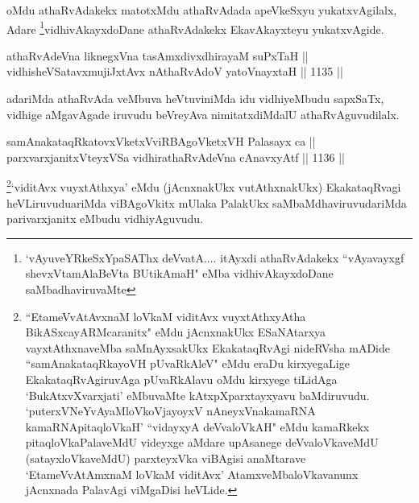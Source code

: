 \begin{artha}
oMdu athaRvAdakekx matotxMdu athaRvAdada apeVkeSxyu yukatxvAgilalx, Adare \footnote{`vAyuveYRkeSxYpaSAThx deVvatA.... itAyxdi athaRvAdakekx ``vAyavayxgf shevxVtamAlaBeVta BUtikAmaH" eMba vidhivAkayxdoDane saMbadhaviruvaMte}vidhivAkayxdoDane athaRvAdakekx EkavAkayxteyu yukatxvAgide.
\end{artha}

\begin{shl}
athaRvAdeVna liknegxVna tasAmxdivxdhirayaM suPxTaH || \\
vidhisheVSatavxmujiJxtAvx nAthaRvAdoV yatoV\s nayxtaH \hfill || 1135 ||  
\end{shl}

\begin{artha}
adariMda athaRvAda veMbuva heVtuviniMda idu vidhiyeMbudu sapxSaTx, vidhige aMgavAgade iruvudu beVreyAva nimitatxdiMdalU athaRvAguvudilalx.
\end{artha}


\begin{shl}
samAnakataqRkatovxVketxVviRBAgoVketxVH Palasayx ca || \\
parxvarxjanitxVteyxVSa vidhirathaRvAdeVna cAnavxyAtf \hfill || 1136 ||  
\end{shl}

\begin{artha}
\footnote{``EtameVvA\s \s tAvxnaM loVkaM viditAvx vuyxtAthxyAtha BikASxcayARMcaranitx" eMdu jAcnxnakUkx ESaNAtarxya vayxtAthxnaveMba saMnAyxsakUkx EkakataqRvAgi nideRVsha mADide ``samAnakataqRkayoVH pUvaRkAleV" eMdu eraDu kirxyegaLige EkakataqRvAgiruvAga pUvaRkAlavu oMdu kirxyege tiLidAga `BukAtxvXvarxjati' eMbuvaMte kAtxpXparxtayxyavu baMdiruvudu. `puterxVNeYvAyaMloVkoVjayoyxV nAneyxVnakamaRNA kamaRNApitaqloVkaH' ``vidayxyA deVvaloVkAH" eMdu kamaRkekx pitaqloVkaPalaveMdU videyxge aMdare upAsanege deVvaloVkaveMdU (satayxloVkaveMdU) parxteyxVka viBAgisi anaMtarave `EtameVvA\s \s tAmxnaM loVkaM viditAvx' AtamxveMbaloVkavanunx jAcnxnada PalavAgi viMgaDisi heVLide.}`viditAvx vuyxtAthxya' eMdu (jAcnxnakUkx vutAthxnakUkx) EkakataqRvagi heVLiruvuduariMda viBAgoVkitx mUlaka PalakUkx saMbaMdhaviruvudariMda parivarxjanitx eMbudu vidhiyAguvudu.
\end{artha}


